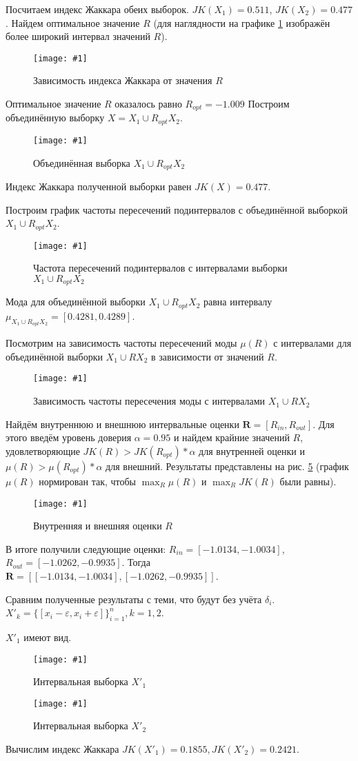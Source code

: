 \documentclass[a4paper,12pt]{article}
\newcommand{\plot}[3]{
    \begin{figure}[H]
        \begin{center}
            \texttt{[image: \#1]}
            \caption{#2}
            \label{#3}
        \end{center}
    \end{figure}
}
\begin{document}
    Посчитаем индекс Жаккара обеих выборок. $ JK(X_1) = 0.511 $, $ JK(X_2) = 0.477 $.
    Найдем оптимальное значение $ R $
    (для наглядности на графике \ref{p:jaccard} изображён более широкий интервал значений $ R $).
    \plot{_Jaccard}{Зависимость индекса Жаккара от значения $R$}{p:jaccard}

    Оптимальное значение $ R $ оказалось равно $ R_{opt} = -1.009 $
    Построим объединённую выборку $ X = X_1 \cup R_{opt} X_2 $.
    \plot{_X1RX2}{Объединённая выборка $ X_1 \cup R_{opt} X_2 $}{p:x1rx2}

    Индекс Жаккара полученной выборки равен $ JK(X) = 0.477 $.

    Построим график частоты пересечений подинтервалов с объединённой выборкой
    $ X_1 \cup R_{opt} X_2 $.
    \plot{_ModaX1RX2Hist}{Частота пересечений подинтервалов с интервалами выборки $ X_1 \cup R_{opt} X_2 $}{p:moadX2RX2}

    Мода для объединённой выборки $ X_1 \cup R_{opt} X_2 $ равна интервалу $ \mu_{X_1 \cup R_{opt} X_2} = [0.4281, 0.4289] $.

    Посмотрим на зависимость частоты пересечений моды $ \mu(R) $ с интервалами
    для объединённой выборки $ X_1 \cup R X_2 $ в зависимости от значений $ R $.
    \plot{_ModaR}{Зависимость частоты пересечения моды с интервалами $ X_1 \cup R X_2 $}{p:modaR}

    Найдём внутреннюю и внешнюю интервальные оценки $ \textbf{R} = [R_{in}, R_{out}] $.
    Для этого введём уровень доверия $ \alpha = 0.95 $ и найдем крайние значений $ R $,
    удовлетворяющие $ JK(R) > JK(R_{opt}) * \alpha $ для внутренней оценки
    и $ \mu(R) > \mu(R_{opt}) * \alpha $ для внешний.
    Результаты представлены на рис. \ref{p:InnerOuter}
    (график $ \mu(R) $ нормирован так, чтобы $ \max_R{\mu(R)} $ и $ \max_R{JK(R)} $ были равны).
    \plot{_InnerOuter}{Внутренняя и внешняя оценки $ R $}{p:InnerOuter} 

    В итоге получили следующие оценки: $ R_{in} = [-1.0134, -1.0034] $,
    $ R_{out} = [-1.0262, -0.9935] $. Тогда $ \textbf{R} = [[-1.0134, -1.0034], [-1.0262, -0.9935]] $.

    Сравним полученные результаты с теми, что будут без учёта $ \delta_i $.
    $ X'_k = \{[x_i - \varepsilon, x_i + \varepsilon]\}^n_{i=1}, k = 1,2 $.

    $ X'_1 $ имеют вид.
    \plot{werr_X1}{Интервальная выборка $ X'_1 $}{p:werrX1}
    \plot{werr_X2}{Интервальная выборка $ X'_2 $}{p:werrX2}
    Вычислим индекс Жаккара $ JK(X'_1) = 0.1855, JK(X'_2) = 0.2421 $.
\end{document}
